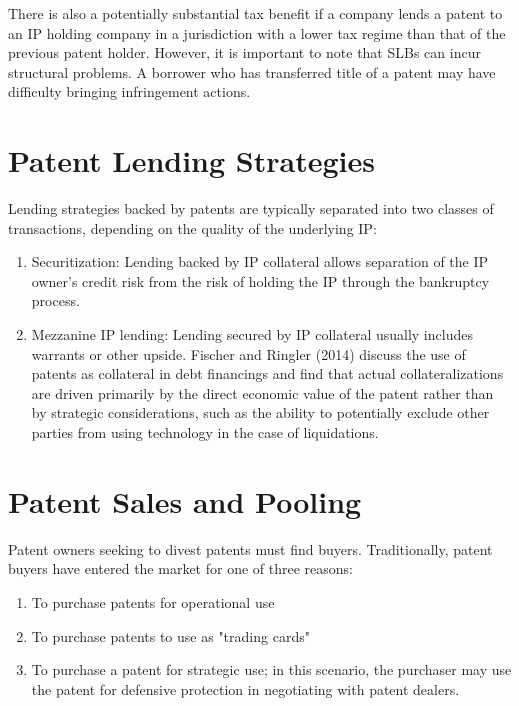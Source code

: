 \documentclass[11pt]{article}
\begin{document}
There is also a potentially substantial tax benefit if a company lends a patent to an IP holding company in a jurisdiction with a lower tax regime than that of the previous patent holder. However, it is important to note that SLBs can incur structural problems. A borrower who has transferred title of a patent may have difficulty bringing infringement actions.

\section*{Patent Lending Strategies}
Lending strategies backed by patents are typically separated into two classes of transactions, depending on the quality of the underlying IP:

\begin{enumerate}
  \item Securitization: Lending backed by IP collateral allows separation of the IP owner's credit risk from the risk of holding the IP through the bankruptcy process.

  \item Mezzanine IP lending: Lending secured by IP collateral usually includes warrants or other upside. Fischer and Ringler (2014) discuss the use of patents as collateral in debt financings and find that actual collateralizations are driven primarily by the direct economic value of the patent rather than by strategic considerations, such as the ability to potentially exclude other parties from using technology in the case of liquidations.

\end{enumerate}

\section*{Patent Sales and Pooling}
Patent owners seeking to divest patents must find buyers. Traditionally, patent buyers have entered the market for one of three reasons:

\begin{enumerate}
  \item To purchase patents for operational use

  \item To purchase patents to use as "trading cards"

  \item To purchase a patent for strategic use; in this scenario, the purchaser may use the patent for defensive protection in negotiating with patent dealers.

\end{enumerate}
\end{document}

